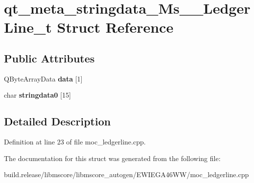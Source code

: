 \hypertarget{structqt__meta__stringdata___ms_____ledger_line__t}{}\section{qt\+\_\+meta\+\_\+stringdata\+\_\+\+Ms\+\_\+\+\_\+\+Ledger\+Line\+\_\+t Struct Reference}
\label{structqt__meta__stringdata___ms_____ledger_line__t}
\subsection*{Public Attributes}
\begin{DoxyCompactItemize}
\item 
\mbox{\label{structqt__meta__stringdata___ms_____ledger_line__t_a857ee354a6dc9870e8d44c0f27ab2f2a}} 
Q\+Byte\+Array\+Data {\bfseries data} \mbox{[}1\mbox{]}
\item 
\mbox{\label{structqt__meta__stringdata___ms_____ledger_line__t_ad31fec5c45c81231e2fd54dd878ec666}} 
char {\bfseries stringdata0} \mbox{[}15\mbox{]}
\end{DoxyCompactItemize}


\subsection{Detailed Description}


Definition at line 23 of file moc\+\_\+ledgerline.\+cpp.



The documentation for this struct was generated from the following file\+:\begin{DoxyCompactItemize}
\item 
build.\+release/libmscore/libmscore\+\_\+autogen/\+E\+W\+I\+E\+G\+A46\+W\+W/moc\+\_\+ledgerline.\+cpp\end{DoxyCompactItemize}
